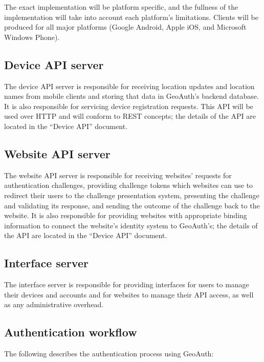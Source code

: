 \documentclass[11pt]{article} %
\begin{document}
The exact implementation will be platform specific, and the fullness of the implementation will take into account each platform's limitations. Clients will be produced for all major platforms (Google Android, Apple iOS, and Microsoft Windows Phone).

\subsection{Device API server}
The device API server is responsible for receiving location updates and location names from mobile clients and storing that data in GeoAuth's backend database. It is also responsible for servicing device registration requests. This API will be used over HTTP and will conform to REST concepts; the details of the API are located in the ``Device API'' document.

\subsection{Website API server}
The website API server is responsible for receiving websites' requests for authentication challenges, providing challenge tokens which websites can use to redirect their users to the challenge presentation system, presenting the challenge and validating its response, and sending the outcome of the challenge back to the website. It is also responsible for providing websites with appropriate binding information to connect the website's identity system to GeoAuth's; the details of the API are located in the ``Device API'' document.

\subsection{Interface server}
The interface server is responsible for providing interfaces for users to manage their devices and accounts and for websites to manage their API access, as well as any administrative overhead.

\subsection{Authentication workflow}
The following describes the authentication process using GeoAuth:
\end{document}
